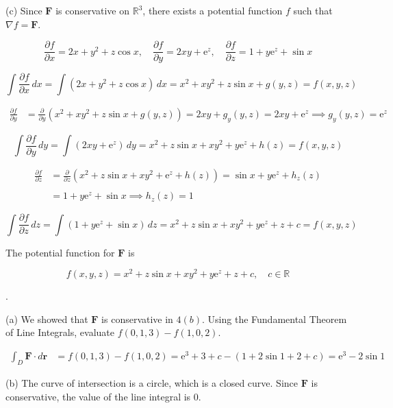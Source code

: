 \documentclass{article}
\begin{document}
\newpage

\noindent (c) Since $\mathbf{F}$ is conservative on $\mathbb{R}^3$, there exists a potential function $f$ such that $\nabla f=\mathbf{F}$.

\[\frac{\partial f}{\partial x}=2x+y^2+z\cos x,\quad\frac{\partial f}{\partial y}=2xy+\mathrm{e}^z,\quad\frac{\partial f}{\partial z}=1+y\mathrm{e}^z+\sin x\]

\[\int\frac{\partial f}{\partial x}\,dx=\int\left(2x+y^2+z\cos x\right)\,dx=x^2+xy^2+z\sin x+g(y,z)=f(x,y,z)\]

\begin{align*}\frac{\partial f}{\partial y}&=\frac{\partial}{\partial y}\left(x^2+xy^2+z\sin x+g(y,z)\right)=2xy+g_y(y,z)=2xy+\mathrm{e}^z\implies g_y(y,z)=\mathrm{e}^z\end{align*}

\[\int\frac{\partial f}{\partial y}\,dy=\int\left(2xy+\mathrm{e}^z\right)\,dy=x^2+z\sin x+xy^2+y\mathrm{e}^z+h(z)=f(x,y,z)\]

\hfill

\begin{align*}\frac{\partial f}{\partial z}&=\frac{\partial}{\partial z}\left(x^2+z\sin x+xy^2+\mathrm{e}^z+h(z)\right)=\sin x+y\mathrm{e}^z+h_z(z)\\\\&=1+y\mathrm{e}^z+\sin x\implies h_z(z)=1\end{align*}

\[\int\frac{\partial f}{\partial z}\,dz=\int\left(1+y\mathrm{e}^z+\sin x\right)\,dz=x^2+z\sin x+xy^2+y\mathrm{e}^z+z+c=f(x,y,z)\]

\hfill

\noindent The potential function for $\mathbf{F}$ is

\[\boxed{f(x,y,z)=x^2+z\sin x+xy^2+y\mathrm{e}^z+z+c,\quad c\in\mathbb{R}}\]

\hfill

.

\hfill

\noindent (a) We showed that $\mathbf{F}$ is conservative in $4(b)$. Using the Fundamental Theorem of Line Integrals, evaluate $f(0,1,3)-f(1,0,2)$.

\begin{align*}\int_D\mathbf{F}\cdot d\mathbf{r}&=f(0,1,3)-f(1,0,2)=\mathrm{e}^3+3+c-(1+2\sin1+2+c)=\boxed{\mathrm{e}^3-2\sin1}\end{align*}

\hfill

\noindent (b) The curve of intersection is a circle, which is a closed curve. Since $\mathbf{F}$ is conservative, the value of the line integral is $\boxed0$.
\end{document}
